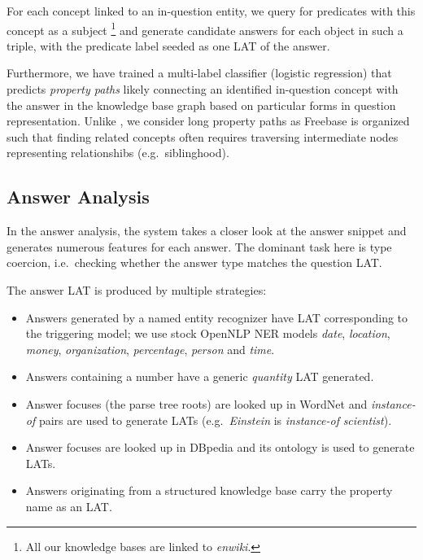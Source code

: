 For each concept
linked to an in-question entity, we query for predicates with this concept as a subject%
\footnote{All our knowledge bases are linked to \textit{enwiki}.}
and generate candidate answers for each object in such a triple, with the predicate label seeded as one LAT of the answer.


Furthermore, we have trained a multi-label classifier (logistic regression)
that predicts \textit{property paths}
likely connecting an identified in-question concept with the answer in the knowledge base
graph based on particular forms in question representation. \cite{LeanFreebaseYao}
Unlike \cite{LeanFreebaseYao}, we consider long property paths as
Freebase is organized such that finding related concepts
often requires traversing intermediate nodes representing relationshibs (e.g.\ siblinghood).

\subsection{Answer Analysis}

In the answer analysis, the system takes a closer look at the answer snippet
and generates numerous features for each answer.
The dominant task here is type coercion,
i.e.\ checking whether the answer type matches the question LAT.

The answer LAT is produced by multiple strategies:
\begin{itemize}
	\item Answers generated by a named entity recognizer have LAT corresponding to the triggering model;
		we use stock OpenNLP NER models \textit{date}, \textit{location}, \textit{money}, \textit{organization}, \textit{percentage}, \textit{person} and \textit{time}.
	\item Answers containing a number have a generic \textit{quantity} LAT generated.
	\item Answer focuses (the parse tree roots) are looked up in WordNet and \textit{instance-of} pairs are used to generate LATs (e.g.\ \textit{Einstein} is \textit{instance-of} \textit{scientist}).
	\item Answer focuses are looked up in DBpedia and its ontology is used to generate LATs.
	\item Answers originating from a structured knowledge base carry the property name as an LAT.
\end{itemize}

